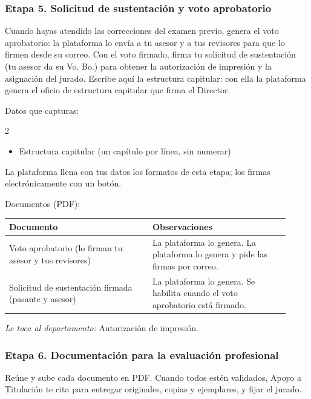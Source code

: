 \subsubsection*{Etapa 5. Solicitud de sustentación y voto aprobatorio}
Cuando hayas atendido las correcciones del examen previo, genera el voto aprobatorio: la plataforma lo envía a tu asesor y a tus revisores para que lo firmen desde su correo. Con el voto firmado, firma tu solicitud de sustentación (tu asesor da su Vo. Bo.) para obtener la autorización de impresión y la asignación del jurado. Escribe aquí la estructura capitular: con ella la plataforma genera el oficio de estructura capitular que firma el Director.

Datos que capturas:
\begin{multicols}{2}\small
\begin{itemize}
  \item Estructura capitular (un capítulo por línea, sin numerar)
\end{itemize}
\end{multicols}

La plataforma llena con tus datos los formatos de esta etapa; los firmas electrónicamente con un botón.

Documentos (PDF):
{\small\begin{longtable}{>{\raggedright\arraybackslash}p{0.47\linewidth}>{\raggedright\arraybackslash}p{0.45\linewidth}}
\toprule
\textbf{Documento} & \textbf{Observaciones}\\
\midrule
\endhead
Voto aprobatorio (lo firman tu asesor y tus revisores) & La plataforma lo genera. La plataforma lo genera y pide las firmas por correo.\\
Solicitud de sustentación firmada (pasante y asesor) & La plataforma lo genera. Se habilita cuando el voto aprobatorio está firmado.\\
\bottomrule
\end{longtable}}

\emph{Le toca al departamento:} Autorización de impresión. 
\subsubsection*{Etapa 6. Documentación para la evaluación profesional}
Reúne y sube cada documento en PDF. Cuando todos estén validados, Apoyo a Titulación te cita para entregar originales, copias y ejemplares, y fijar el jurado.

